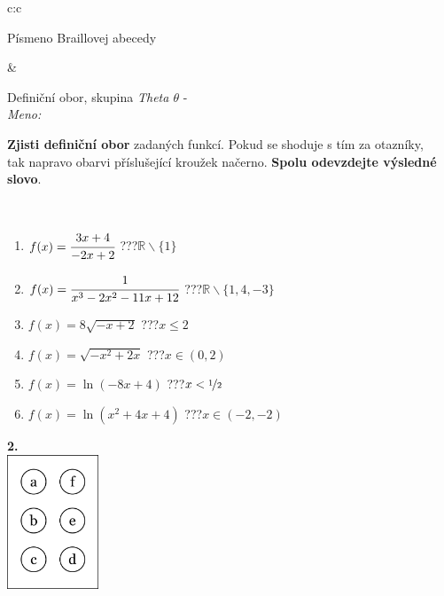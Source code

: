 \documentclass[10pt]{report}
\begin{document}
\begin{tabular}{c:c}
\begin{minipage}[c][104.5mm][t]{0.5\linewidth}
\begin{center}
\begin{minipage}{0.20\linewidth}
\begin{center}
{\small Písmeno Braillovej abecedy}
\end{center}
\end{minipage}
\end{center}
\end{minipage}
&
\begin{minipage}[c][104.5mm][t]{0.5\linewidth}
\begin{center}
\vspace{7mm}
{\huge Definiční obor, skupina \textit{Theta $\theta$} -}\\[5mm]
\textit{Meno:}\phantom{xxxxxxxxxxxxxxxxxxxxxxxxxxxxxxxxxxxxxxxxxxxxxxxxxxxxxxxxxxxxxxxxx}\\[5mm]
\begin{minipage}{0.95\linewidth}
\textbf{Zjisti definiční obor} zadaných funkcí. Pokud se shoduje s tím za otazníky,\\tak napravo obarvi příslušející kroužek načerno. \textbf{Spolu odevzdejte výsledné slovo}.
\end{minipage}
\\[1mm]
\begin{minipage}{0.79\linewidth}
\begin{center}
\begin{varwidth}{\linewidth}
\begin{enumerate}
\normalsizerrr
\item $f(x)=\cfrac{3x+4}{-2x+2}$\quad \dotfill\; ???\;\dotfill \quad $\mathbb{R}\smallsetminus\{1\}$
\item $f(x)=\cfrac{1}{x^3-2x^2-11x+12}$\quad \dotfill\; ???\;\dotfill \quad $\mathbb{R}\smallsetminus\{1,4,-3\}$
\item $f(x)=8\sqrt{-x+2}$\quad \dotfill\; ???\;\dotfill \quad $x\leq2$
\item $f(x)=\sqrt{-x^2+2x}$\quad \dotfill\; ???\;\dotfill \quad $x\in(0 , 2)$
\item $f(x)=\ln{(-8x+4)}$\quad \dotfill\; ???\;\dotfill \quad $x<\nicefrac{1}{2}$
\item $f(x)=\ln{(x^2+4x+4)}$\quad \dotfill\; ???\;\dotfill \quad $x\in(-2 , -2)$
\end{enumerate}
\end{varwidth}
\end{center}
\end{minipage}
\begin{minipage}{0.20\linewidth}
\begin{center}
{\Huge\bfseries 2.} \\[2mm]
\includegraphics[height=40mm]{../images/braille.png}

\end{center}
\end{minipage}
\end{center}
\end{minipage}
\end{tabular}
\end{document}
